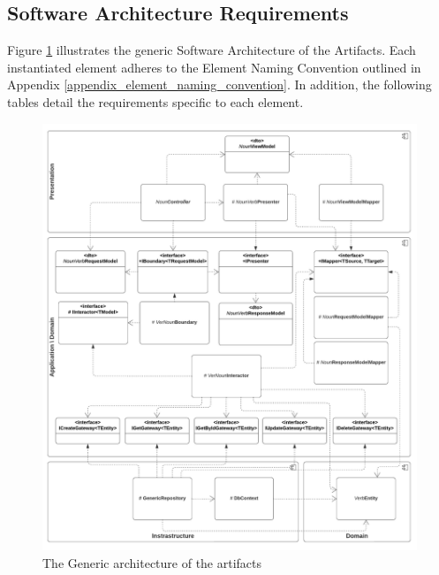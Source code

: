 \subsection{Software Architecture Requirements} \label{software_requirements}

Figure \ref{fig_design} illustrates the generic Software Architecture of the Artifacts.
Each instantiated element adheres to the Element Naming Convention outlined in Appendix
\ref{appendix_element_naming_convention}. In addition, the following tables detail the
requirements specific to each element.

\begin{figure}[H]
    \centering
    \includegraphics[width=1\textwidth]{figures/generic_design.pdf}
    \caption[Generic architecture]{The Generic architecture of the artifacts}
    \label{fig_design}
\end{figure}


